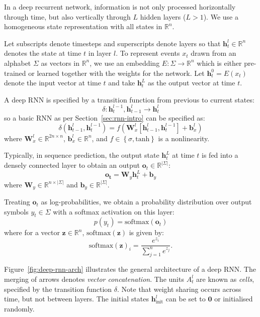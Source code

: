 \documentclass[12pt,a4paper,twoside,openright]{report}
\newcommand{\set}[1]{ \left\{ #1 \right\} }
\newcommand{\vect}[1]{\boldsymbol{\mathbf{#1}}}
\begin{document}
In a deep recurrent network, information is not only processed horizontally
through time, but also vertically through $L$ hidden layers ($L > 1$). We use a
homogeneous state representation with all states in $\mathbb{R}^n$.

Let subscripts denote timesteps and superscripts denote layers so that
$\vect{h}_t^l \in \mathbb{R}^n$ denotes the state at time $t$ in layer $l$. To
represent events $x_t$ drawn from an alphabet $\Sigma$ as vectors in
$\mathbb{R}^n$, we use an embedding $E : \Sigma \rightarrow \mathbb{R}^n$ which
is either pre-trained or learned together with the weights for the network. Let
$\vect{h}_t^0 = E(x_t)$ denote the input vector at time $t$ and take
$\vect{h}_t^L$ as the output vector at time $t$.

A deep RNN is specified by a transition function from previous to current
states:
$$ \delta : \vect{h}_t^{l-1}, \vect{h}_{t-1}^l \rightarrow \vect{h}_t^l $$
so a basic RNN as per Section~\ref{sec:rnn-intro} can be specified as:
$$ \delta(\vect{h}_{t-1}^l, \vect{h}_t^{l-1}) = f(\vect{W}^l_x [\vect{h}_{t-1}^l,
\vect{h}_t^{l-1}] + \vect{b}^l_x) $$
where $\vect{W}^l_x \in \mathbb{R}^{2n \times n}$, $\vect{b}^l_x \in
\mathbb{R}^n$, and $f \in \set{ \sigma, \mathrm{tanh} }$ is a nonlinearity.

Typically, in sequence prediction, the output state $\vect{h}_t^L$ at time $t$
is fed into a densely connected layer to obtain an output $\vect{o}_t \in
\mathbb{R}^{|\Sigma|}$:
$$ \vect{o_t} = \vect{W}_y \vect{h}_t^L + \vect{b}_y $$
where $\vect{W}_y \in \mathbb{R}^{n \times |\Sigma|}$ and $\vect{b}_y \in
\mathbb{R}^{|\Sigma|}$. 

Treating $\vect{o}_t$ as log-probabilities, we obtain a probability distribution
over output symbols $y_t \in \Sigma$ with a softmax activation on this layer:
$$ p(y_t) = \mathrm{softmax}(\vect{o}_t) $$
where for a vector $\vect{z} \in \mathbb{R}^n$, $\mathrm{softmax}(\vect{z})$ is
given by:
$$ \mathrm{softmax}(\vect{z})_i = \frac{ e^{z_i} }{ \sum_{j = 1}^n e^{z_j} }. $$

Figure~\ref{fig:deep-rnn-arch} illustrates the general architecture of a deep
RNN. The merging of arrows denotes \emph{vector concatenation}. The units
$A_t^l$ are known as \emph{cells}, specified by the transition function
$\delta$.  Note that weight sharing occurs across time, but not between layers.
The initial states $\vect{h}_{\mathrm{init}}^l$ can be set to $\vect{0}$ or
initialised randomly.
\end{document}
